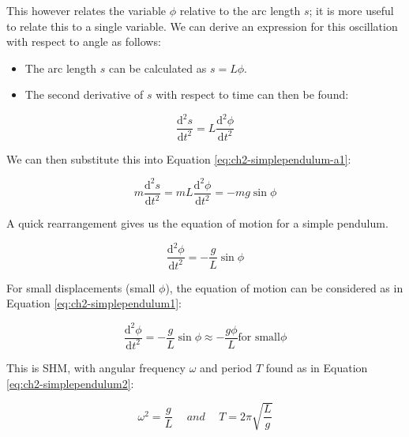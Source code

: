 \documentclass[
]{book}
\providecommand{\tightlist}{%
  \setlength{\itemsep}{0pt}\setlength{\parskip}{0pt}}
\begin{document}
This however relates the variable \(\phi\) relative to the arc length \(s\); it is more useful to relate this to a single variable. We can derive an expression for this oscillation with respect to angle as follows:

\begin{itemize}
\tightlist
\item
  The arc length \(s\) can be calculated as \(s = L \phi\).
\item
  The second derivative of \(s\) with respect to time can then be found:
\end{itemize}

\begin{equation}
\frac{\mathrm{d}^2 s}{\mathrm{d} t^2} = L \frac{\mathrm{d}^2 \phi}{\mathrm{d} t^2}
\label{eq:ch2-simplependulum-a2}
\end{equation}

We can then substitute this into Equation \eqref{eq:ch2-simplependulum-a1}:

\begin{equation}
m \frac{\mathrm{d}^2 s}{\mathrm{d} t^2} = m L \frac{\mathrm{d}^2 \phi}{\mathrm{d} t^2} =  -mg \sin \phi
\label{eq:ch2-simplependulum-a3}
\end{equation}

A quick rearrangement gives us the equation of motion for a simple pendulum.

\begin{equation}
\frac{\mathrm{d}^2 \phi}{\mathrm{d} t^2} =  -\frac{g}{L} \sin \phi
\label{eq:ch2-simplependulum-a3}
\end{equation}

For small displacements (small \(\phi\)), the equation of motion can be considered as in Equation \eqref{eq:ch2-simplependulum1}:

\begin{equation}
\frac{\mathrm{d}^2 \phi}{\mathrm{d} t^2} = -\frac{g}{L}\sin \phi \approx -\frac{g \phi}{L} \textrm{for small} \phi
\label{eq:ch2-simplependulum1}
\end{equation}

This is SHM, with angular frequency \(\omega\) and period \(T\) found as in Equation \eqref{eq:ch2-simplependulum2}:

\begin{equation}
\omega^2 = \frac{g}{L} \hspace{15pt} and \hspace{15pt} T = 2\pi \sqrt{\frac{L}{g}}
\label{eq:ch2-simplependulum2}
\end{equation}
\end{document}
